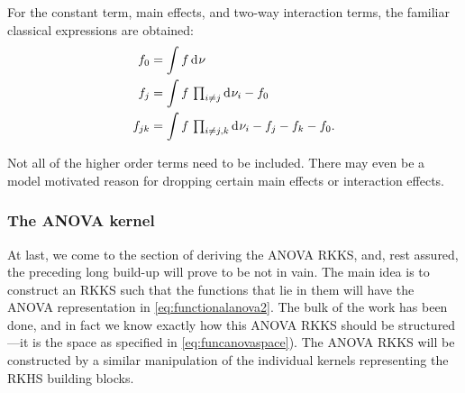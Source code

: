 \documentclass[a4paper,showframe,11pt,draft]{report}
\begin{document}

For the constant term, main effects, and two-way interaction terms, the familiar classical expressions are obtained:
\begin{align*}
  f_0 &= \int f \operatorname{d\!\:\!}\nu \\
  f_j &= \int f \, \textstyle\prod_{i\neq j} \operatorname{d\!\:\!}\nu_i  - f_0 \\
  f_{jk} &= \int f \, \textstyle\prod_{i\neq j,k} \operatorname{d\!\:\!}\nu_i  - f_j - f_k - f_0  .
\end{align*}



\begin{remark}
  Not all of the higher order terms need to be included. There may even be a model motivated reason for dropping certain main effects or interaction effects.  
\end{remark}


\subsubsection{The ANOVA kernel}

At last, we come to the section of deriving the ANOVA RKKS, and, rest assured, the preceding long build-up will prove to be not in vain.
The main idea is to construct an RKKS such that the functions that lie in them will have the ANOVA representation in \eqref{eq:functionalanova2}.
The bulk of the work has been done, and in fact we know exactly how this ANOVA RKKS should be structured---it is the space as specified in \eqref{eq:funcanovaspace}). 
The ANOVA RKKS will be constructed by a similar manipulation of the individual kernels representing the RKHS building blocks.
\end{document}
